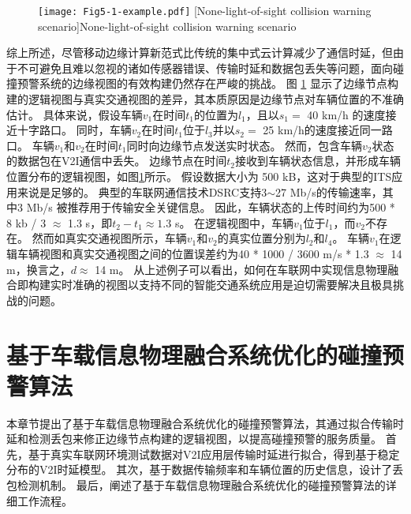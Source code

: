 \begin{figure}[h]
	\centering
	\texttt{[image: Fig5-1-example.pdf]}
	[None-light-of-sight collision warning scenario]{None-light-of-sight collision warning scenario}
	\label{fig 5-1}
\end{figure}

综上所述，尽管移动边缘计算新范式比传统的集中式云计算减少了通信时延，但由于不可避免且难以忽视的诸如传感器错误、传输时延和数据包丢失等问题，面向碰撞预警系统的边缘视图的有效构建仍然存在严峻的挑战。
图 \ref{fig 5-1} 显示了边缘节点构建的逻辑视图与真实交通视图的差异，其本质原因是边缘节点对车辆位置的不准确估计。
具体来说，假设车辆$v_1$在时间$t_1$的位置为$l_1$，且以$s_1 =$ 40 km/h 的速度接近十字路口。
同时，车辆$v_2$在时间$t_1$位于$l_3$并以$s_2=$ 25 km/h的速度接近同一路口。
车辆$v_1$和$v_2$在时间$t_1$同时向边缘节点发送实时状态。
然而，包含车辆$v_2$状态的数据包在V2I通信中丢失。
边缘节点在时间$t_2$接收到车辆状态信息，并形成车辆位置分布的逻辑视图，如图\ref{fig 5-1}所示。
假设数据大小为 500 kB，这对于典型的ITS应用来说是足够的\cite{liu2013improving}。
典型的车联网通信技术DSRC支持3$\sim$27 Mb/s的传输速率，其中3 Mb/s 被推荐用于传输安全关键信息\cite{kenney2011dedicated}。
因此，车辆状态的上传时间约为500 * 8 kb / 3 $\approx$ 1.3 s，即${t_2} - {t_1} \approx 1.3$ s。
在逻辑视图中，车辆$v_1$位于$l_1$，而$v_2$不存在。
然而如真实交通视图所示，车辆$v_1$和$v_2$的真实位置分别为$l_2$和$l_4$。
车辆$v_1$在逻辑车辆视图和真实交通视图之间的位置误差约为40 * 1000 / 3600 m/s * 1.3 $\approx$ 14 m，换言之，$d \approx$ 14 m。
从上述例子可以看出，如何在车联网中实现信息物理融合即构建实时准确的视图以支持不同的智能交通系统应用是迫切需要解决且极具挑战的问题。

\section[\hspace{-2pt}基于车载信息物理融合系统优化的碰撞预警算法]{{ \hspace{-8pt}基于车载信息物理融合系统优化的碰撞预警算法}}\label{section 5-3}

本章节提出了基于车载信息物理融合系统优化的碰撞预警算法，其通过拟合传输时延和检测丢包来修正边缘节点构建的逻辑视图，以提高碰撞预警的服务质量。
首先，基于真实车联网环境测试数据对V2I应用层传输时延进行拟合，得到基于稳定分布的V2I时延模型。
其次，基于数据传输频率和车辆位置的历史信息，设计了丢包检测机制。
最后，阐述了基于车载信息物理融合系统优化的碰撞预警算法的详细工作流程。

